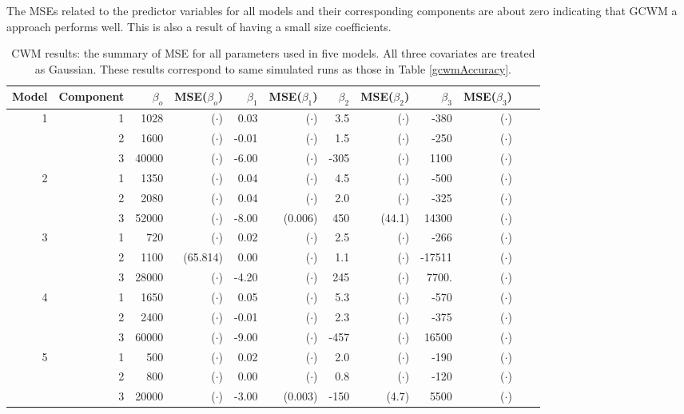 \documentclass[11pt,letterpaper]{article}
\numberwithin{equation}{section}
\numberwithin{equation}{section}
\numberwithin{equation}{section}
\begin{document}
The MSEs related to the predictor variables for all models and their corresponding components are about zero indicating that  GCWM a approach performs well. This is also a result of having a small size coefficients.

\begin{table}[!htb]
\centering
\caption{CWM results: the summary of MSE for all parameters used in five models. All three covariates are treated as Gaussian. These results correspond to same simulated runs as those in Table \ref{gcwmAccuracy}.}
\label{my-label}
\begin{tabular}{rrrrrrrrrrrr}
\hline\hline
Model & Component & $\beta_o$ &  MSE($\beta_o$)   &  $\beta_1$ & MSE($\beta_1$)& $\beta_2$ &MSE($\beta_2$)   & $\beta_3$ &  MSE($\beta_3$)  \\
\hline
1     & 1         & 1028& ($\cdot$)   & 0.03&  ($\cdot$)   & 3.5&  ($\cdot$)    & -380&  ($\cdot$)    \\
      & 2         & 1600&  ($\cdot$)      & -0.01& ($\cdot$)  & 1.5& ($\cdot$)     & -250& ($\cdot$)  \\
      & 3         & 40000& ($\cdot$)     & -6.00& ($\cdot$)  & -305& ($\cdot$)  & 1100& ($\cdot$)    \\
2     & 1         & 1350& ($\cdot$)     & 0.04& ($\cdot$) & 4.5& ($\cdot$)    & -500& ($\cdot$)  \\
      & 2         & 2080&  ($\cdot$)    & 0.04& ($\cdot$)   & 2.0& ($\cdot$)     & -325& ($\cdot$)   \\
      & 3         & 52000&  ($\cdot$)     & -8.00& (0.006)  & 450& (44.1)   & 14300& ($\cdot$)  \\
3     & 1         & 720&  ($\cdot$)     & 0.02& ($\cdot$)   & 2.5& ($\cdot$)    & -266& ($\cdot$)    \\
      & 2         & 1100&  (65.814)     & 0.00& ($\cdot$)   & 1.1& ($\cdot$)     & -17511& ($\cdot$)  \\
      & 3         & 28000& ($\cdot$)   & -4.20& ($\cdot$)  & 245& ($\cdot$)   & 7700.& ($\cdot$)  \\
4     & 1         & 1650& ($\cdot$)    & 0.05& ($\cdot$)  & 5.3& ($\cdot$)    & -570& ($\cdot$)  \\
      & 2         & 2400&  ($\cdot$)     & -0.01& ($\cdot$)  & 2.3& ($\cdot$)    & -375& ($\cdot$)    \\
      & 3         & 60000&  ($\cdot$)     & -9.00& ($\cdot$)  & -457& ($\cdot$)  & 16500& ($\cdot$)   \\
5     & 1         & 500&  ($\cdot$)     & 0.02& ($\cdot$)   & 2.0& ($\cdot$)   & -190& ($\cdot$)  \\
      & 2         & 800&  ($\cdot$)      & 0.00& ($\cdot$)   & 0.8& ($\cdot$)    & -120& ($\cdot$)  \\
      & 3         & 20000&  ($\cdot$)     & -3.00& (0.003)  & -150& (4.7) & 5500& ($\cdot$) \\
      \hline\hline
\end{tabular}
\end{table}
\end{document}
